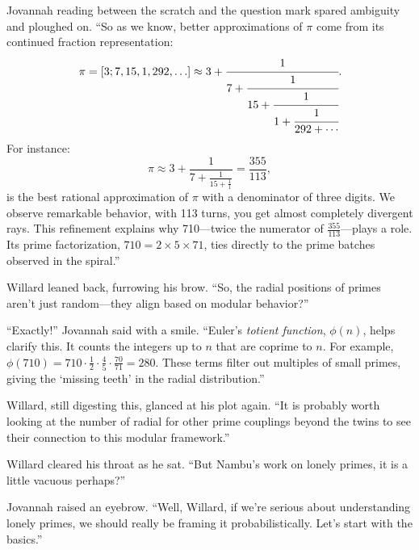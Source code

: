 Jovannah reading between the scratch and the question mark spared ambiguity and ploughed on. “So as we know, better approximations of \( \pi \) come from its continued fraction representation:
\[
\pi = [3; 7, 15, 1, 292, \ldots] \approx 3 + \cfrac{1}{7 + \cfrac{1}{15 + \cfrac{1}{1 + \cfrac{1}{292 + \cdots}}}}.
\]
For instance:
\[
\pi \approx 3 + \frac{1}{7 + \frac{1}{15 + \frac{1}{1}}} = \frac{355}{113},
\]
is the best rational approximation of \( \pi \) with a denominator of three digits. We observe remarkable behavior, with 113 turns, you get almost completely divergent rays. This refinement explains why 710—twice the numerator of \( \frac{355}{113} \)—plays a role. Its prime factorization, \( 710 = 2 \times 5 \times 71 \), ties directly to the prime batches observed in the spiral.”
\bigskip

Willard leaned back, furrowing his brow. “So, the radial positions of primes aren’t just random—they align based on modular behavior?”
\bigskip

“Exactly!” Jovannah said with a smile. “Euler’s \emph{totient function}, \( \phi(n) \), helps clarify this. It counts the integers up to \( n \) that are coprime to \( n \). For example, \( \phi(710) = 710 \cdot \frac{1}{2} \cdot \frac{4}{5} \cdot \frac{70}{71} = 280 \). These terms filter out multiples of small primes, giving the ‘missing teeth’ in the radial distribution.”
\bigskip

Willard, still digesting this, glanced at his plot again. “It is probably worth looking at the number of radial for other prime couplings beyond the twins to see their connection to this modular framework.”


Willard cleared his throat as he sat. “But Nambu’s work on lonely primes, it is a little vacuous perhaps?”
\bigskip

Jovannah raised an eyebrow. “Well, Willard, if we’re serious about understanding lonely primes, we should really be framing it probabilistically. Let’s start with the basics.”

\bigskip

